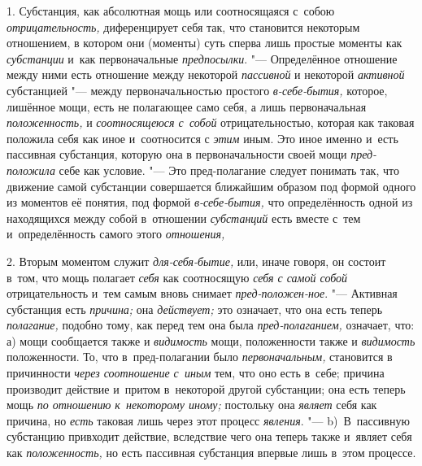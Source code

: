 1. Субстанция, как абсолютная мощь или соотносящаяся с~собою {\em отрицательность,}
диференцирует себя так, что становится некоторым отношением,
в котором они (моменты) суть сперва лишь простые моменты как
{\em субстанции} и~как первоначальные {\em предпосылки}. "---
Определённое отношение между ними есть отношение между некоторой {\em пассивной}
и некоторой {\em активной} субстанцией "--- между первоначальностью простого
{\em в-себе-бытия,} которое, лишённое мощи, есть не полагающее само себя,
а лишь первоначальная {\em положенность,} и {\em соотносящеюся с~собой}
отрицательностью, которая как таковая положила себя как иное и~соотносится с
{\em этим} иным. Это иное именно и~есть пассивная субстанция, которую она в
первоначальности своей мощи {\em пред-положила} себе как условие. "--- Это
пред-полагание следует понимать так, что движение самой субстанции
совершается ближайшим образом под формой одного из моментов её понятия, под
формой {\em в-себе-бытия,} что определённость одной из находящихся между
собой в~отношении {\em субстанций} есть вместе с~тем и~определённость самого
этого {\em отношения,}

2. Вторым моментом служит {\em для-себя-бытие,} или, иначе говоря, он
состоит в~том, что мощь полагает {\em себя} как соотносящую {\em себя с
самой собой} отрицательность и~тем самым вновь снимает
{\em пред-положен-ное}. "--- Активная субстанция есть {\em причина;} она
{\em действует;} это означает, что она есть теперь {\em полагание,} подобно
тому, как перед тем она была {\em пред-полаганием,} означает, что: а) мощи
сообщается также и {\em видимость} мощи, положенности также и {\em видимость}
положенности. То, что в~пред-полагании было {\em первоначальным,} становится
в причинности {\em через соотношение с~иным} тем, что оно есть в~себе;
причина производит действие и~притом в~некоторой другой субстанции; она есть
теперь мощь {\em по отношению к~некоторому иному;} постольку она {\em являет}
себя как причина, но {\em есть} таковая лишь через этот процесс {\em явления}.
"--- b)~В~пассивную субстанцию привходит действие, вследствие чего она теперь
также и~являет себя как {\em положенность,} но есть пассивная субстанция
впервые лишь в~этом процессе.

